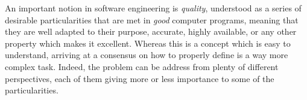 







An important notion in software engineering is \textit{quality}, understood as a series of desirable particularities that are met in \textit{good} computer programs, meaning that they are well adapted to their purpose, accurate, highly available, or any other property which makes it excellent.
Whereas this is a concept which is easy to understand, arriving at a consensus on how to properly define is a way more complex task. Indeed, the problem can be address from plenty of different perspectives, each of them giving more or less importance to some of the particularities.

